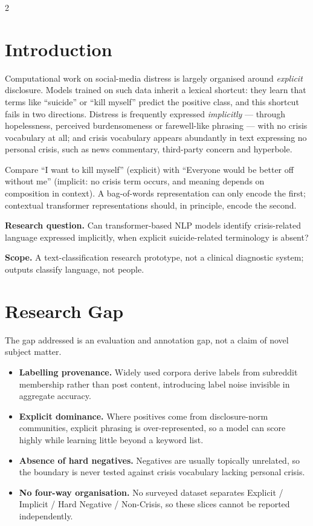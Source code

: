 \documentclass[11pt]{article}
\begin{document}
\begin{multicols}{2}
\fontsize{10}{11.8}\selectfont
\raggedcolumns

\section{Introduction}
Computational work on social-media distress is largely organised around \emph{explicit} disclosure. Models trained on such data inherit a lexical shortcut: they learn that terms like ``suicide'' or ``kill myself'' predict the positive class, and this shortcut fails in two directions. Distress is frequently expressed \emph{implicitly} --- through hopelessness, perceived burdensomeness or farewell-like phrasing --- with no crisis vocabulary at all; and crisis vocabulary appears abundantly in text expressing no personal crisis, such as news commentary, third-party concern and hyperbole.

Compare ``I want to kill myself'' (explicit) with ``Everyone would be better off without me'' (implicit: no crisis term occurs, and meaning depends on composition in context). A bag-of-words representation can only encode the first; contextual transformer representations should, in principle, encode the second.

\textbf{Research question.} Can transformer-based NLP models identify crisis-related language expressed implicitly, when explicit suicide-related terminology is absent?

\textbf{Scope.} A text-classification research prototype, not a clinical diagnostic system; outputs classify language, not people.

\section{Research Gap}
The gap addressed is an evaluation and annotation gap, not a claim of novel subject matter.
\begin{itemize}
\item \textbf{Labelling provenance.} Widely used corpora derive labels from subreddit membership rather than post content, introducing label noise invisible in aggregate accuracy.
\item \textbf{Explicit dominance.} Where positives come from disclosure-norm communities, explicit phrasing is over-represented, so a model can score highly while learning little beyond a keyword list.
\item \textbf{Absence of hard negatives.} Negatives are usually topically unrelated, so the boundary is never tested against crisis vocabulary lacking personal crisis.
\item \textbf{No four-way organisation.} No surveyed dataset separates Explicit / Implicit / Hard Negative / Non-Crisis, so these slices cannot be reported independently.
\end{itemize}


\end{multicols}
\end{document}
